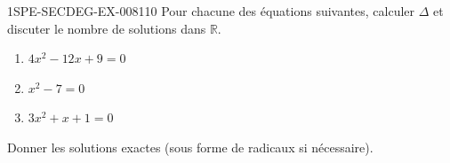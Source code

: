 \begin{exercice}{1SPE-SECDEG-EX-008}{1}{10}
Pour chacune des équations suivantes, calculer $\Delta$ et discuter le nombre de solutions dans $\mathbb{R}$.

\begin{enumerate}
  \item $4x^2 - 12x + 9 = 0$
  \item $x^2 - 7 = 0$
  \item $3x^2 + x + 1 = 0$
\end{enumerate}

Donner les solutions exactes (sous forme de radicaux si nécessaire).
\end{exercice}
